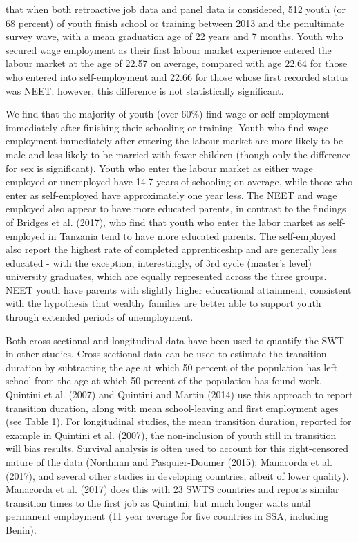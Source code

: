 \documentclass[
  11pt,
a4paper
]{article}
\begin{document}
that when both retroactive job data and panel data is considered, 512 youth (or 68 percent) of youth finish school or training between 2013 and the penultimate survey wave, with a mean graduation age of 22 years and 7 months. Youth who secured wage employment as their first labour market experience entered the labour market at the age of 22.57 on average, compared with age 22.64 for those who entered into self-employment and 22.66 for those whose first recorded status was NEET; however, this difference is not statistically significant.

We find that the majority of youth (over 60\%) find wage or self-employment immediately after finishing their schooling or training. Youth who find wage employment immediately after entering the labour market are more likely to be male and less likely to be married with fewer children (though only the difference for sex is significant). Youth who enter the labour market as either wage employed or unemployed have 14.7 years of schooling on average, while those who enter as self-employed have approximately one year less. The NEET and wage employed also appear to have more educated parents, in contrast to the findings of Bridges et al. (2017), who find that youth who enter the labor market as self-employed in Tanzania tend to have more educated parents. The self-employed also report the highest rate of completed apprenticeship and are generally less educated - with the exception, interestingly, of 3rd cycle (master's level) university graduates, which are equally represented across the three groups. NEET youth have parents with slightly higher educational attainment, consistent with the hypothesis that wealthy families are better able to support youth through extended periods of unemployment.

Both cross-sectional and longitudinal data have been used to quantify the SWT in other studies. Cross-sectional data can be used to estimate the transition duration by subtracting the age at which 50 percent of the population has left school from the age at which 50 percent of the population has found work. Quintini et al. (2007) and Quintini and Martin (2014) use this approach to report transition duration, along with mean school-leaving and first employment ages (see Table 1). For longitudinal studies, the mean transition duration, reported for example in Quintini et al. (2007), the non-inclusion of youth still in transition will bias results. Survival analysis is often used to account for this right-censored nature of the data (Nordman and Pasquier-Doumer (2015); Manacorda et al. (2017), and several other studies in developing countries, albeit of lower quality). Manacorda et al. (2017) does this with 23 SWTS countries and reports similar transition times to the first job as Quintini, but much longer waits until permanent employment (11 year average for five countries in SSA, including Benin).
\end{document}

